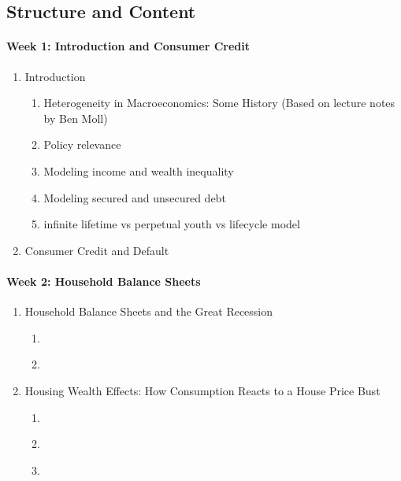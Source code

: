 \documentclass[a4paper,11pt]{article}
\begin{document}
\subsection*{Structure and Content}

\paragraph{Week 1: Introduction and Consumer Credit}
\begin{enumerate}
\item Introduction
  \begin{enumerate}
  \item Heterogeneity in Macroeconomics: Some History (Based on lecture notes by Ben Moll)
  \item Policy relevance
  \item Modeling income and wealth inequality
  \item Modeling secured and unsecured debt
  \item infinite lifetime vs perpetual youth vs lifecycle model
  \end{enumerate}

\item Consumer Credit and Default \citep{athreya2002welfare,chatterjee2007quantitative,livshits2007consumer}
\end{enumerate}

\paragraph{Week 2: Household Balance Sheets}

\begin{enumerate}
\item Household Balance Sheets and the Great Recession
  \begin{enumerate}
  \item \cite{mian2013household}
  \item \cite{berger2015consumption}
  \end{enumerate}
\item Housing Wealth Effects: How Consumption Reacts to a House Price Bust
  \begin{enumerate}
  \item \cite{berger2018house}
  \item \cite{guren2021housing}
  \item \cite{greimel2019understanding}
  \end{enumerate}
\end{enumerate}
\end{document}
